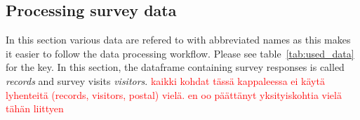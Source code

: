 \subsection{Processing survey data}
\label{sec:processdata} %
\justify

In this section various data are refered to with abbreviated names as this makes it easier to follow the data processing workflow. Please see table~\ref{tab:used_data} for the key. In this section, the dataframe containing survey responses is called \textit{records} and survey visits \textit{visitors}. \textcolor{red}{kaikki kohdat tässä kappaleessa ei käytä lyhenteitä (records, visitors, postal) vielä. en oo päättänyt yksityiskohtia vielä tähän liittyen}

